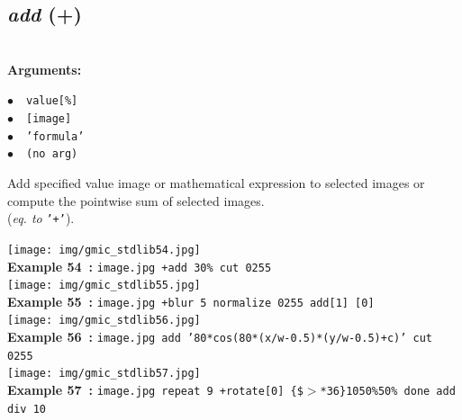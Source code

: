 \documentclass[a4paper,10.5pt,twoside]{book}
\def\comma{\discretionary{,}{}{,}}
\newcommand{\Cb}[1]{\textcolor{cb}{#1}}
\begin{document}
\subsection{\emph{add} (+)}\vspace*{-0.7em}
~\\\textbf{\Cb{Arguments: }}\begin{flushleft}
{\small \Cb{\hspace*{0.5cm}$\bullet$~~\texttt{value[\%]}}}~~~\\
{\small \Cb{\hspace*{0.5cm}$\bullet$~~\texttt{[image]}}}~~~\\
{\small \Cb{\hspace*{0.5cm}$\bullet$~~\texttt{'formula'}}}~~~\\
{\small \Cb{\hspace*{0.5cm}$\bullet$~~\texttt{(no arg)}}}\end{flushleft}
Add specified value{\comma} image or mathematical expression to selected images{\comma}
or compute the pointwise sum of selected images.
~\\(\emph{eq. to} {\small \texttt{'+'}}).
\begin{center}\texttt{[image: img/gmic\_stdlib54.jpg]}\\
{\footnotesize \textbf{Example 54~:} \texttt{image.jpg +add 30\% cut 0{\comma}255}}
\\\texttt{[image: img/gmic\_stdlib55.jpg]}\\
{\footnotesize \textbf{Example 55~:} \texttt{image.jpg +blur 5 normalize 0{\comma}255 add[1] [0]}}
\\\texttt{[image: img/gmic\_stdlib56.jpg]}\\
{\footnotesize \textbf{Example 56~:} \texttt{image.jpg add '80*cos(80*(x/w-0.5)*(y/w-0.5)+c)' cut 0{\comma}255}}
\\\texttt{[image: img/gmic\_stdlib57.jpg]}\\
{\footnotesize \textbf{Example 57~:} \texttt{image.jpg repeat 9 +rotate[0] \{\$$>$*36\}{\comma}1{\comma}0{\comma}50\%{\comma}50\% done add div 10}}
\end{center}
\end{document}
